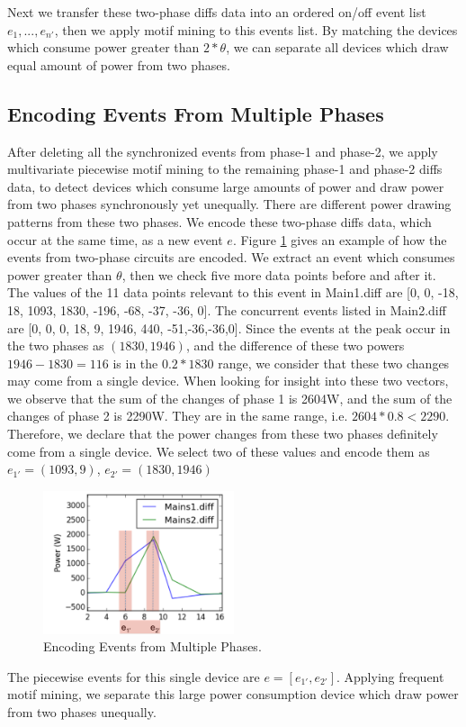 Next we transfer these two-phase diffs data into 
an ordered on/off event list $e_1, ..., e_{n'}$,
then we apply motif mining to this events list. 
By matching the devices which consume power greater than $2*\theta$, 
we can separate all devices which draw equal amount of power from two phases.  

\subsection{Encoding Events From Multiple Phases}
After deleting all the synchronized events from phase-1 and phase-2, 
we apply multivariate piecewise motif mining to the remaining phase-1 and phase-2 diffs data, 
to detect devices which consume large amounts of power 
and draw power from two phases synchronously yet unequally. 
There are different power drawing patterns from these two phases.  
We encode these two-phase diffs data, which occur at the same time, as a new event $e$. 
Figure \ref{fig_eventEncoding} gives an example of how the events from two-phase circuits
are encoded. 
We extract an event which consumes power greater than $\theta$, 
then we check five more data points before and after it. 
The values of the 11 data points relevant to this event in Main1.diff are [0, 0, -18, 18, 1093, 1830, -196, -68, -37, -36, 0]. 
The concurrent events listed in Main2.diff are [0, 0, 0, 18, 9, 1946, 440, -51,-36,-36,0]. 
Since the events at the peak occur in the two phases as $(1830, 1946)$, 
and the difference of these two powers $1946-1830=116$ is in the $0.2*1830$ range, 
we consider that these two changes may come from a single device. 
When looking for insight into these two vectors, 
we observe that the sum of the changes of phase 1 is 2604W, and the sum of the changes of phase 2 is 2290W. 
They are in the same range, i.e. $2604*0.8 < 2290$. 
Therefore, we declare that the power changes from these two phases definitely come from a single device. 
We select two of these values and encode them as $e_{1'}=(1093, 9)$, $e_{2'}= (1830, 1946)$
\begin{figure}[h]
\centering
\includegraphics[width=0.5\textwidth]{multidisaggfig/synchronizeDifferentEventEncoding.pdf}
\caption{Encoding Events from Multiple Phases.}
\label{fig_eventEncoding}
\end{figure}

The piecewise events for this single device are $e= [e_{1'}, e_{2'}]$. 
Applying frequent motif mining, 
we separate this large power consumption device which draw power from two phases unequally. 



